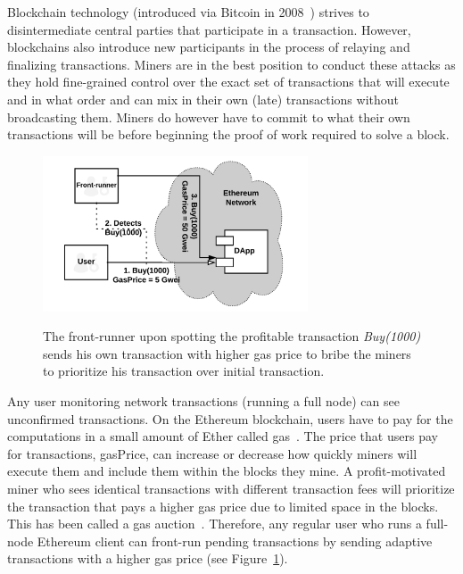 Blockchain technology (introduced via Bitcoin in 2008~\cite{nakamoto2008bitcoin}) strives to disintermediate central parties that participate in a transaction. However, blockchains also introduce new participants in the process of relaying and finalizing transactions. Miners are in the best position to conduct these attacks as they hold fine-grained control over the exact set of transactions that will execute and in what order and can mix in their own (late) transactions without broadcasting them. Miners do however have to commit to what their own transactions will be before beginning the proof of work required to solve a block.

\begin{figure}[t]
    \centering
    {\includegraphics[width=0.7\textwidth]{figures/Regular_frontrunning.png}}
    {\caption[Simple Front-running Flow on a Blockchain]{The front-runner upon spotting the profitable transaction \textit{Buy(1000)} sends his own transaction with higher gas price to bribe the miners to prioritize his transaction over initial transaction.}\label{fig:RegularFrontrunning}}
    \end{figure}

    
Any user monitoring network transactions (\eg running a full node) can see unconfirmed transactions. On the Ethereum blockchain, users have to pay for the computations in a small amount of Ether called \textsf{gas}~\cite{AccountT67:online}. The price that users pay for transactions, \textsf{gasPrice}, can increase or decrease how quickly miners will execute them and include them within the blocks they mine. A profit-motivated miner who sees identical transactions with different transaction fees will prioritize the transaction that pays a higher gas price due to limited space in the blocks. This has been called a gas auction~\cite{frontrunme}. Therefore, any regular user who runs a full-node Ethereum client can front-run pending transactions by sending adaptive transactions with a higher gas price (see Figure~\ref{fig:RegularFrontrunning}).

